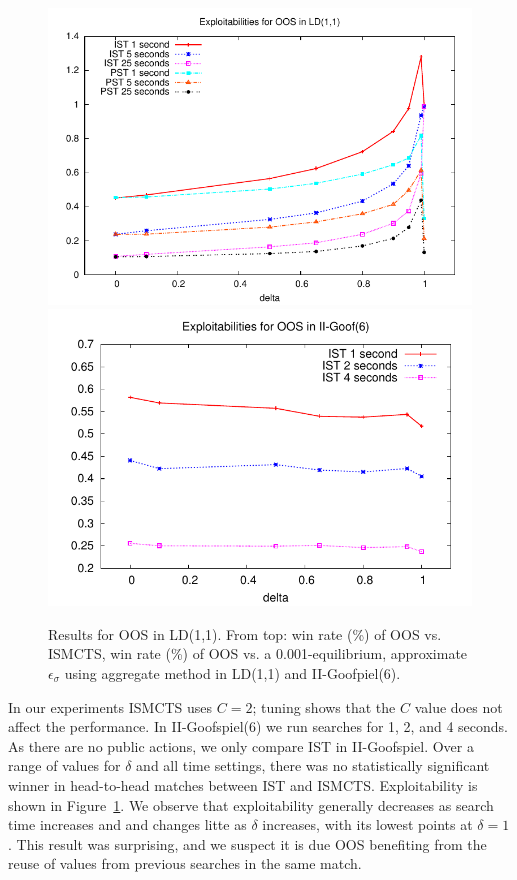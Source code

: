 \documentclass[letterpaper]{article}
\begin{document}
\begin{figure}[t!]
\begin{center}
\includegraphics[scale=0.5]{plots/oos-expl} \\
\includegraphics[scale=0.5]{plots/goof-expl} \\
\caption{Results for OOS in LD(1,1). From top: win rate (\%) of OOS vs. ISMCTS, win rate (\%) of 
OOS vs. a 0.001-equilibrium, approximate $\epsilon_{\sigma}$ using aggregate method in LD(1,1) 
and II-Goofpiel(6).}
\label{fig:results}
\end{center}
\end{figure}


In our experiments ISMCTS uses $C = 2$; tuning shows that the $C$ value does not 
affect the performance. 
In II-Goofspiel(6) we run searches for 1, 2, and 4 seconds.
As there are no public actions, we only compare IST in II-Goofspiel. 
Over a range of values for $\delta$ and all time settings, there was no statistically significant
winner in head-to-head matches between IST and ISMCTS. 
Exploitability is shown in Figure~\ref{fig:results}. We observe that exploitability generally 
decreases as search time increases and and changes litte as $\delta$ increases, with its 
lowest points at $\delta = 1$. 
This result was surprising, and we suspect it is due OOS benefiting from the reuse of 
values from previous searches in the same match.
\end{document}
